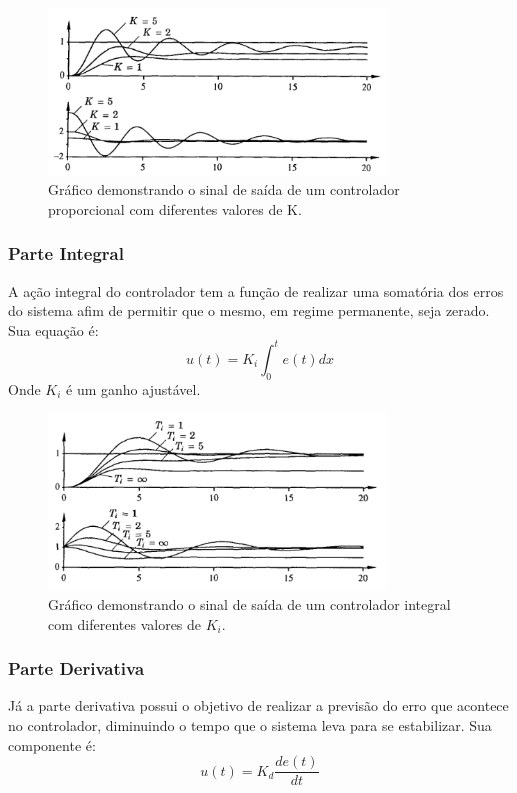 \begin{figure}[ht]
    \centering
    \includegraphics[width=0.8\textwidth]{capitulos/acao_controle_proporcional.png}
    \caption{Gráfico demonstrando o sinal de saída de um controlador proporcional com diferentes valores de K. \cite{astrom1995}}
    \label{fig:acao_controle_proporcional}
\end{figure}
\subsubsection{Parte Integral}
A ação integral do controlador tem a função de realizar uma somatória dos erros do sistema afim de permitir que o mesmo, em regime permanente, seja zerado.\cite{ogata2011engenharia} Sua equação é:
\begin{equation}
    u(t) = K_{i} \int_0^t e(t) dx
\end{equation}
Onde $K_{i}$ é um ganho ajustável.

\begin{figure}[ht]
    \centering
    \includegraphics[width=0.8\textwidth]{capitulos/acao_controle_integral.png}
    \caption{Gráfico demonstrando o sinal de saída de um controlador integral com diferentes valores de $K_{i}$. \cite{astrom1995}}
    \label{fig:acao_controle_integral}
\end{figure}
\subsubsection{Parte Derivativa}
Já a parte derivativa possui o objetivo de realizar a previsão do erro que acontece no controlador, diminuindo o tempo que o sistema leva para se estabilizar.\cite{ogata2011engenharia} Sua componente é:
\begin{equation}
    u(t) = K_{d} \frac{de(t)}{dt}
\end{equation}

